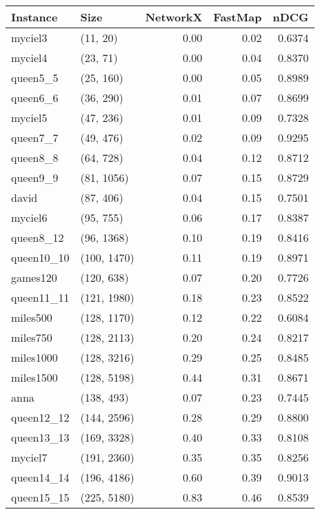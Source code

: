\begin{tabular}{llrrr}
\toprule
  Instance &         Size &  NetworkX &  FastMap &   nDCG \\
\midrule
   myciel3 &     (11, 20) &      0.00 &     0.02 & 0.6374 \\
   myciel4 &     (23, 71) &      0.00 &     0.04 & 0.8370 \\
  queen5\_5 &    (25, 160) &      0.00 &     0.05 & 0.8989 \\
  queen6\_6 &    (36, 290) &      0.01 &     0.07 & 0.8699 \\
   myciel5 &    (47, 236) &      0.01 &     0.09 & 0.7328 \\
  queen7\_7 &    (49, 476) &      0.02 &     0.09 & 0.9295 \\
  queen8\_8 &    (64, 728) &      0.04 &     0.12 & 0.8712 \\
  queen9\_9 &   (81, 1056) &      0.07 &     0.15 & 0.8729 \\
     david &    (87, 406) &      0.04 &     0.15 & 0.7501 \\
   myciel6 &    (95, 755) &      0.06 &     0.17 & 0.8387 \\
 queen8\_12 &   (96, 1368) &      0.10 &     0.19 & 0.8416 \\
queen10\_10 &  (100, 1470) &      0.11 &     0.19 & 0.8971 \\
  games120 &   (120, 638) &      0.07 &     0.20 & 0.7726 \\
queen11\_11 &  (121, 1980) &      0.18 &     0.23 & 0.8522 \\
  miles500 &  (128, 1170) &      0.12 &     0.22 & 0.6084 \\
  miles750 &  (128, 2113) &      0.20 &     0.24 & 0.8217 \\
 miles1000 &  (128, 3216) &      0.29 &     0.25 & 0.8485 \\
 miles1500 &  (128, 5198) &      0.44 &     0.31 & 0.8671 \\
      anna &   (138, 493) &      0.07 &     0.23 & 0.7445 \\
queen12\_12 &  (144, 2596) &      0.28 &     0.29 & 0.8800 \\
queen13\_13 &  (169, 3328) &      0.40 &     0.33 & 0.8108 \\
   myciel7 &  (191, 2360) &      0.35 &     0.35 & 0.8256 \\
queen14\_14 &  (196, 4186) &      0.60 &     0.39 & 0.9013 \\
queen15\_15 &  (225, 5180) &      0.83 &     0.46 & 0.8539 \\

\end{tabular}
